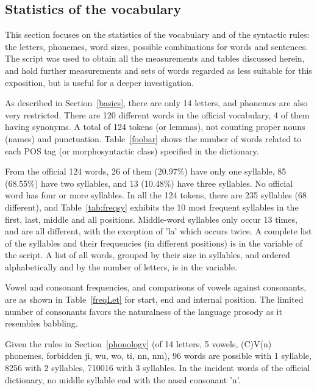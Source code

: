 \subsection{Statistics of the vocabulary}\label{sec:stat}
This section focuses on the statistics of the vocabulary
and of the syntactic rules:
the letters, phonemes, word sizes,
possible combinations for words and sentences.
The script 
was used to obtain all the measurements and tables
discussed herein,
and hold further measurements and sets of words
regarded as less suitable for this exposition,
but is useful for a deeper investigation.

As described in Section~\ref{basics},
there are only 14 letters,
and phonemes are also very restricted.
There are 120 different words in the official vocabulary,
4 of them having synonyms.
A total of 124 tokens (or lemmas),
not counting proper nouns (names)
and punctuation.
Table~\ref{foobar} shows the number of words
related to each POS tag (or morphosyntactic class)
specified in the dictionary.



From the official 124 words, 
26 of them (20.97\%)
have only one syllable,
85 (68.55\%) have two syllables,
and 13 (10.48\%) have three syllables.
No official word has four or more syllables.
In all the 124 tokens, there are 235 syllables (68 different),
and Table~\ref{tab:freqsy} exhibits the 10 most frequent
syllables in the first, last, middle and all positions.
Middle-word syllables only occur 13 times,
and are all different, with the exception of 'la'
which occurs twice.
A complete list of the syllables and their frequencies (in different
positions) is in the  variable of the 
script.
A list of all words, grouped by their size in syllables,
and ordered alphabetically and by the number of letters,
is in the  variable.



Vowel and consonant frequencies,
and comparisons of vowels against consonants,
are as shown in Table~\ref{freqLet}
for start, end and internal position.
The limited number of consonants favors
the naturalness of the language prosody
as it resembles babbling.



Given the rules in Section~\ref{phonology}
(of 14 letters, 5 vowels, (C)V(n) phonemes,
forbidden ji, wu, wo, ti, nn, nm),
96 words are possible with 1 syllable,
8256 with 2 syllables, 710016 with 3 syllables.
In the incident words of the official dictionary,
no middle syllable end with the nasal consonant 'n'.

